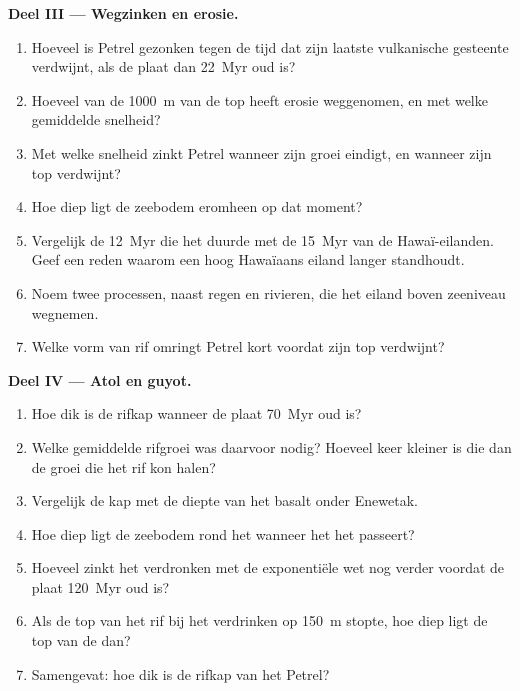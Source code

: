 \begin{problem}
\noindent\textbf{Deel III --- Wegzinken en erosie.}
\begin{enumerate}[resume]
  \item Hoeveel is Petrel gezonken tegen de tijd dat zijn laatste vulkanische gesteente verdwijnt, als de plaat
        dan \qty{22}{Myr} oud is?
  \item Hoeveel van de \qty{1000}{m} van de top heeft erosie weggenomen, en met welke gemiddelde snelheid?
  \item Met welke snelheid zinkt Petrel wanneer zijn groei eindigt, en wanneer zijn top verdwijnt?
  \item Hoe diep ligt de zeebodem eromheen op dat moment?
  \item Vergelijk de \qty{12}{Myr} die het duurde met de \qty{15}{Myr} van de Hawaï-eilanden. Geef een
        reden waarom een hoog Hawaïaans eiland langer standhoudt.
  \item Noem twee processen, naast regen en rivieren, die het eiland boven zeeniveau wegnemen.
  \item Welke vorm van rif omringt Petrel kort voordat zijn top verdwijnt?
\end{enumerate}

\noindent\textbf{Deel IV --- Atol en guyot.}
\begin{enumerate}[resume]
  \item Hoe dik is de rifkap wanneer de plaat \qty{70}{Myr} oud is?
  \item Welke gemiddelde rifgroei was daarvoor nodig? Hoeveel keer kleiner is die dan de groei
        die het rif kon halen?
  \item Vergelijk de kap met de diepte van het basalt onder Enewetak.
  \item Hoe diep ligt de zeebodem rond het  wanneer het het  passeert?
  \item Hoeveel zinkt het verdronken  met de exponentiële wet nog verder voordat de plaat
        \qty{120}{Myr} oud is?
  \item Als de top van het rif bij het verdrinken op \qty{150}{m} stopte, hoe diep ligt de top van de
         dan?
  \item Samengevat: hoe dik is de rifkap van het  Petrel?
\end{enumerate}
\end{problem}
